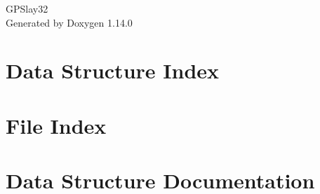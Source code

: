 \documentclass[twoside]{book}
\newcommand{\+}{\discretionary{\mbox{\scriptsize$\hookleftarrow$}}{}{}}
\newcommand{\clearemptydoublepage}{%
    \newpage{\pagestyle{empty}\cleardoublepage}%
  }
\begin{document}
  \raggedbottom
    \hypersetup{pageanchor=false,
                bookmarksnumbered=true,
                pdfencoding=unicode
               }
  \begin{titlepage}
  \vspace*{7cm}
  \begin{center}%
  {\Large GPSlay32}\\
  \vspace*{1cm}
  {\large Generated by Doxygen 1.14.0}\\
  \end{center}
  \end{titlepage}
  \clearemptydoublepage
  \tableofcontents
  \clearemptydoublepage
  \hypersetup{pageanchor=true}

\chapter{Data Structure Index}

\chapter{File Index}

\chapter{Data Structure Documentation}







\end{document}
